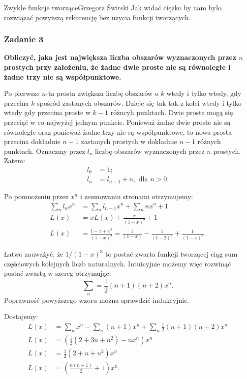\begin{referat}{Zwykłe funkcje tworzące}{Grzegorz Świrski}
Jak widać ciężko by nam było rozwiązać powyższą rekurencję bez użycia funkcji tworzących.

\subsubsection{Zadanie 3}
\textbf{Obliczyć, jaka jest największa liczba obszarów wyznaczonych przez
$n$ prostych przy założeniu, że żadne dwie proste nie są równoległe
i żadne trzy nie są współpunktowe.}

Po pierwsze $n$-ta prosta zwiększa liczbę obszarów o $k$ wtedy
i tylko wtedy, gdy przecina $k$ spośród zastanych obszarów. Dzieje się
tak tak z kolei wtedy i tylko wtedy gdy przecina proste w $k-1$ różncyh punktach.
Dwie proste mogą się przeciąć w co najwyżej jednym punkcie. Ponieważ żadne dwie proste
nie są równoległe oraz ponieważ żadne trzy nie są współpunktowe, to nowa prosta
przecina dokładnie $n-1$ zastanych prostych w dokładnie $n-1$ różnych punktach. Oznaczmy
przez $l_n$ liczbę obszarów wyznaczonych przez $n$ prostych. Zatem:
\begin{align*}
  l_0 &= 1; \\
  l_n &= l_{n-1} + n, \text{ dla } n > 0.
\end{align*}

Po pomnożeniu przez $x^n$ i zsumowaniu stronami otrzymujemy:
\begin{align*}
  \sum_n l_n x^n &= \sum_n l_{n-1} x^n + \sum_n nx^n + 1 \\
  L(x) &= xL(x) + \frac{x}{(1-x)^2} + 1 \\
  L(x) &= \frac{1-x+x^2}{(1-x)^3} = \frac{1}{(1-x)} - \frac{1}{(1-2)^2} + \frac{1}{(1-x)^3}.
\end{align*}

Łatwo zauważyć, że $1/(1-x)^3$ to postać zwarta funkcji tworzącej ciąg sum częściowych kolejnych
liczb naturalnych. Intuicyjnie możemy więc rozwinąć postać zwartą w szereg otrzymując:
$$\sum_n = \frac{1}{2}(n+1)(n+2)x^n.$$
Poprawność powyższego wzoru można sprawdzić indukcyjnie.

Dostajemy:
\begin{align*}
  L(x) &= \sum_n x^n - \sum_n (n+1)x^n + \sum_n \frac{1}{2}(n+1)(n+2)x^n \\
  L(x) &= \left(\frac{1}{2}(2+3n+n^2) - nx^n\right)x^n \\
  L(x) &= \frac{1}{2}(2+n+n^2)x^n \\
  L(x) &= \left(\frac{n(n+1)}{2} + 1\right)x^n.
\end{align*}


\end{referat}
